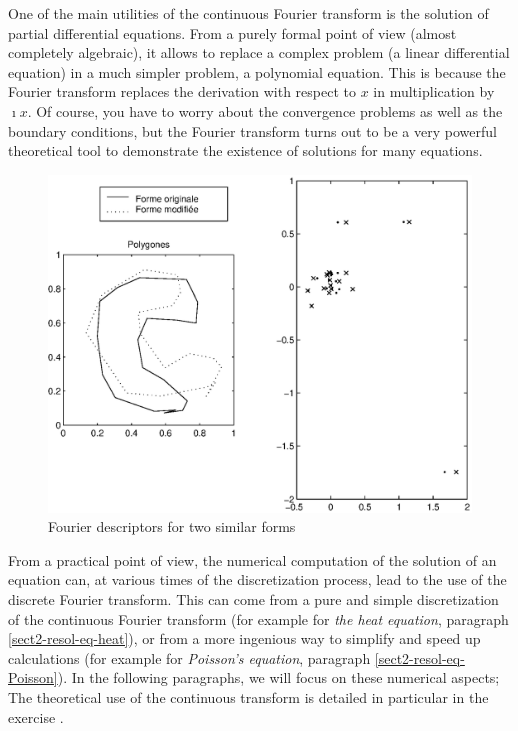 One of the main utilities of the continuous Fourier transform is the solution of partial differential equations. From a purely formal point of view (almost completely algebraic), it allows to replace a complex problem (a linear differential equation) in a much simpler problem, a polynomial equation. This is because the Fourier transform replaces the derivation with respect to $ x $ in multiplication by $ \imath x $. Of course, you have to worry about the convergence problems as well as the boundary conditions, but the Fourier transform turns out to be a very powerful theoretical tool to demonstrate the existence of solutions for many equations. \begin{figure}[ht ]
    \begin{center}
    \includegraphics[scale=0.6]{images/fourier-descriptors.eps}
    \end{center}
    \caption{Fourier descriptors for two similar forms}
              \label{fig-fourier-descriptors}
\end{figure}
 
 
 
From a practical point of view, the numerical computation of the solution of an equation can, at various times of the discretization process, lead to the use of the discrete Fourier transform. This can come from a pure and simple discretization of the continuous Fourier transform (for example for \textit{the heat equation}, paragraph \ref{sect2-resol-eq-heat}), or from a more ingenious way to simplify and speed up calculations (for example for \textit{Poisson's equation}, paragraph \ref{sect2-resol-eq-Poisson}). In the following paragraphs, we will focus on these numerical aspects; The theoretical use of the continuous transform is detailed in particular in the exercise .

